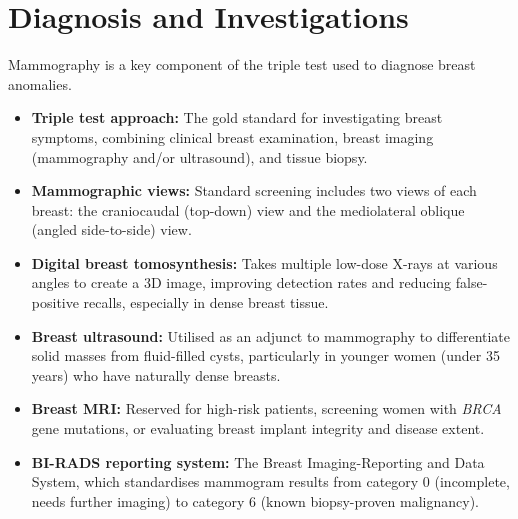 \section*{Diagnosis and Investigations}
Mammography is a key component of the triple test used to diagnose breast anomalies.
\begin{itemize}
    \item \textbf{Triple test approach:} The gold standard for investigating breast symptoms, combining clinical breast examination, breast imaging (mammography and/or ultrasound), and tissue biopsy.
    \item \textbf{Mammographic views:} Standard screening includes two views of each breast: the craniocaudal (top-down) view and the mediolateral oblique (angled side-to-side) view.
    \item \textbf{Digital breast tomosynthesis:} Takes multiple low-dose X-rays at various angles to create a 3D image, improving detection rates and reducing false-positive recalls, especially in dense breast tissue.
    \item \textbf{Breast ultrasound:} Utilised as an adjunct to mammography to differentiate solid masses from fluid-filled cysts, particularly in younger women (under 35 years) who have naturally dense breasts.
    \item \textbf{Breast MRI:} Reserved for high-risk patients, screening women with \textit{BRCA} gene mutations, or evaluating breast implant integrity and disease extent.
    \item \textbf{BI-RADS reporting system:} The Breast Imaging-Reporting and Data System, which standardises mammogram results from category 0 (incomplete, needs further imaging) to category 6 (known biopsy-proven malignancy).
\end{itemize}

